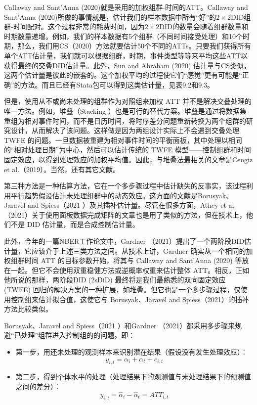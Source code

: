 \documentclass[cn,12pt,math=newtx,citestyle=gb7714-2015,bibstyle=gb7714-2015]{elegantbook}
\begin{document}
	
	Callaway and Sant'Anna (2020)就是采用的加权组群-时间的ATT。Callaway and Sant'Anna (2020)所做的事情就是，估计我们的样本数据中所有“好”的$2 \times 2$DID组群-时间配对。这个过程非常的耗费时间，因为$2 \times 2$DID的数量会随着组群数量和时期数量递增。例如，我们的样本数据有5个组群（不同时间接受处理）和10个时期，那么，我们用CS（2020）方法就要估计50个不同的ATTs。只要我们获得所有单个ATT估计量，我们就可以根据组群，时期，事件类型等等来平均这些ATT以获得最终的交叠DID估计量。此外，Sun and Abraham (2020) 估计量与CS类似，这两个估计量是彼此的嵌套的。这个加权平均的过程使它们“感觉”更有可能是“正确”的方法。而且已经有Stata包可以得到这类估计量，见表9.2和9.3。
	
	但是，使用从不或尚未处理的组群作为对照组来加权 ATT 并不是解决交叠处理的唯一方法。例如，堆叠（Stacking ）也是可行的替代方案。堆叠是通过将数据集重组为相对事件时间，而不是日历时间，将时序差分问题重新转换为两个组群的研究设计，从而解决了该问题。这样做是因为两组设计实际上不会遇到交叠处理TWFE 的问题。一旦数据被重建为相对事件时间的平衡面板，其中处理以相同的“相对处理日期”为中心，然后可以估计传统的 TWFE 模型——控制组群和时间固定效应，以得到处理效应的加权平均值。因此，与堆叠法最相关的文章是Cengiz  et al.（2019）。当然，还有其它文献。
	
	第三种方法是一种估算方法，它在一个多步骤过程中估计缺失的反事实，该过程利用平行趋势假设估计未处理组群中的动态效应。这方面的文献是Borusyak、Jaravel and Spiess（2021 ）及其插补估计量。尽管在很多方面，Athey et al.（2021）关于使用面板数据完成矩阵的文章也是用了类似的方法，但在技术上，他们不是 DID 估计量，而是合成控制估计量。
	
	此外，今年的一篇NBER工作论文中，Gardner （2021）提出了一个两阶段DID估计量，它应该介于上述三类方法之间。从技术上讲，Gardner 确实从一个相同的加权组群时间 ATT 的目标参数开始，将其与 Callaway and Sant'Anna (2020) 等放在一起。但它不会使用双重稳健方法或逆概率权重来估计整体 ATT。相反，正如他所说的那样，两阶段DID (2sDiD) 最终将是我们最熟悉的双向固定效应 (TWFE) 回归的解决方案的一种扩展，如堆叠。但它也是一个多步骤过程，仅使用控制组来估计拟合值，这使它与 Borusyak、Jaravel and Spiess（2021）的插补方法比较类似。
	
	Borusyak、Jaravel and Spiess（2021 ）和Gardner （2021）都采用多步骤来规避“已处理”组群进入控制组的的问题。即：
	
	\begin{itemize}
		\item 第一步，用还未处理的观测样本来识别潜在结果（假设没有发生处理效应）：
		$$y_{i,t} = \alpha_i +\alpha_t +e_{i,t}$$
		\item 第二步，得到个体水平的处理（处理结果下的观测值与未处理结果下的预测值之间的差分）：
		$$y_{i,t} = \hat{\alpha}_i - \hat{\alpha}_t = ATT_{i,t}$$
	\end{itemize}
	
\end{document}
